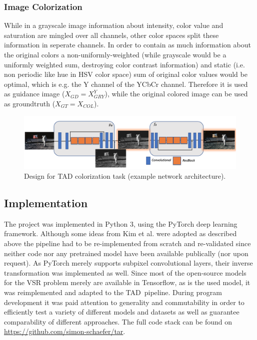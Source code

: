 \subsubsection*{Image Colorization}
While in a grayscale image information about intensity, color value and
saturation are mingled over all channels, other color spaces split these
information in seperate channels. In order to contain as much information about
the original colors a non-uniformly-weighted (while grayscale would be a
uniformly weighted sum, destroying color contrast information) and static
(i.e. non periodic like hue in HSV color space) sum of original color values
would be optimal, which is e.g. the Y channel of the YCbCr channel. Therefore
it is used as guidance image ($X_{GD} = X_{GRY}^Y$), while the original colored
image can be used as groundtruth ($X_{GT} = X_{COL}$).

\begin{figure}[!htbp]
	\centering
	\includegraphics[width=14cm]{figures/architecture_color}
	\caption{Design for \ac{TAD} colorization task (example network architecture).}
  \label{fig:architecture_color}
\end{figure}

\subsection{Implementation}
\label{sec:Approach_IMP}
The project was implemented in Python 3, using the PyTorch deep learning
framework. Although some ideas from Kim et al. \cite{TAID} were adopted as
described above the pipeline had to be re-implemented from scratch and
re-validated since neither code nor any pretrained model have been
available publically (nor upon request). As PyTorch merely supports
subpixel convolutional layers, their inverse transformation was implemented as
well. Since most of the open-source models for the \ac{VSR} problem merely are
available in Tensorflow, as is the used model, it was reimplemented and
adapted to the \ac{TAD} pipeline.
\newline
During program development it was paid attention to generality and
commutability in order to efficiently test a variety of different models and
datasets as well as guarantee comparability of different approaches. The full
code stack can be found on \url{https://github.com/simon-schaefer/tar}.

